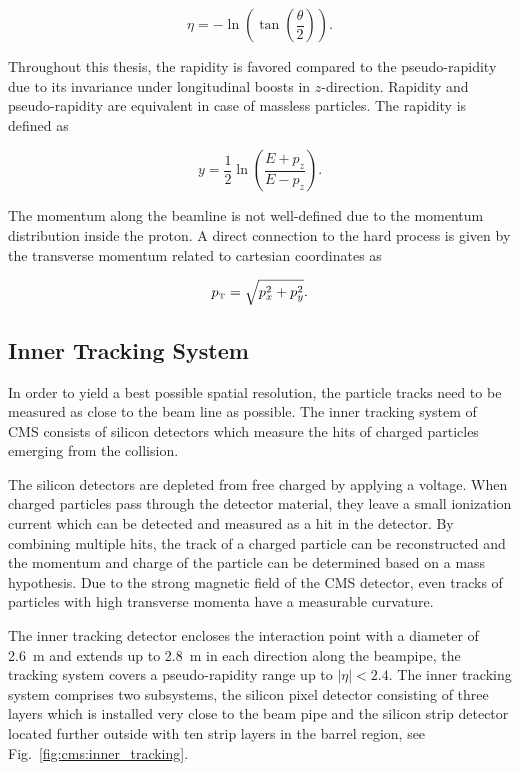 \begin{equation*}
    \eta = - \ln \left( \tan \left( \frac{\theta}{2} \right) \right).
\end{equation*}

Throughout this thesis, the rapidity is favored compared to the pseudo-rapidity
due to its invariance under longitudinal boosts in $z$-direction. Rapidity
and pseudo-rapidity are equivalent in case of massless particles. The
rapidity is defined as

\begin{equation*}
    y = \frac{1}{2} \ln \left( \frac{E + p_z}{E - p_z} \right).
\end{equation*}

The momentum along the beamline is not well-defined due to the momentum
distribution inside the proton. A direct connection to the hard process is given
by the transverse momentum \pt related to cartesian coordinates as

\begin{equation*}
    \pt = \sqrt{p_x^2 + p_y^2}.
\end{equation*}

\subsection{Inner Tracking System}

In order to yield a best possible spatial resolution, the particle tracks need to be
measured as close to the beam line as possible. The inner tracking system of CMS
consists of silicon detectors which measure the hits of charged
particles emerging from the collision. 

The silicon detectors are depleted from free charged by applying a voltage. When
charged particles pass through the detector material, they leave a small
ionization current which can be detected and measured as a hit in the detector.
By combining multiple hits, the track of a charged particle can be reconstructed
and the momentum and charge of the particle can be determined based on a mass
hypothesis. Due to the strong magnetic field of the CMS detector, even tracks of
particles with high transverse momenta have a measurable curvature.
 
The inner tracking detector encloses the interaction point with a diameter of
\SI{2.6}{\meter} and extends up to \SI{2.8}{\meter} in each direction along the
beampipe, the tracking system covers a pseudo-rapidity range up to $|\eta| <
2.4$. The inner tracking system comprises two subsystems, the silicon pixel
detector consisting of three layers which is installed very close to the beam
pipe and the silicon strip detector located further outside with ten strip
layers in the barrel region, see Fig.~\ref{fig:cms:inner_tracking}. 

